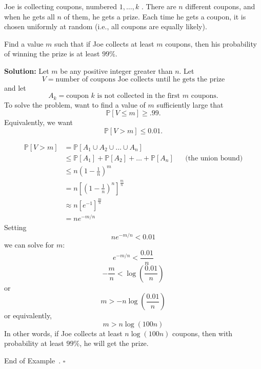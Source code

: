 \documentclass[10pt]{article}
\theoremstyle{definition}
\newtheorem{example}[theorem]{Example}
\renewenvironment{example}
{\begin{oldexample}}
  {\par\smallskip\hfill   End of Example~\theexample. $\square$    \par\end{oldexample}}
\newcommand{\fl}{\noindent\textbf} %
\newcommand{\1}[1]{\textbf{1}_{\left[#1\right]}} %
\def\P{\mathbb{P}} %
\begin{document}
\begin{example}
  Joe is collecting coupons, numbered $1,\ldots,k$ . There are $n$ different
  coupons, and when he gets all $n$ of them, he gets a prize. Each time he
  gets a coupon, it is chosen uniformly at random (i.e., all coupons are
  equally likely).

  Find a value $m$ such that if Joe collects at least $m$ coupons, then his
  probability of winning the prize is at least $99\%$.

  \fl{Solution:} Let $m$ be any positive integer greater than $n$. Let
  \begin{equation*}
    V = \text{number of coupons Joe collects until he gets the prize}
  \end{equation*}
  and let
  \begin{equation*}
    A_{k} = \text{coupon $k$ is not collected in the first $m$ coupons}.
  \end{equation*}
  To solve the problem, want to find a value of $m$ sufficiently large that
  \begin{equation*}
    \P\left[V \leq m\right] \geq .99.
  \end{equation*}
  Equivalently, we want
  \begin{equation*}
    \P\left[V>m \right] \leq 0.01.
  \end{equation*}%

  \begin{align*}
    \P\left[V>m \right] 
    &= \P\left[A_{1}\cup A_{2}\cup \ldots \cup A_{n} \right]\\
    &\leq \P\left[A_{1} \right]+ \P\left[A_{2} \right]+\ldots+\P\left[A_{n}
      \right] &&\text{(the union bound)}\\
    &\leq n \left( 1-\frac{1}{n} \right)^{m}\\ 
    &= n \left[ \left( 1-\frac{1}{n} \right)^{n}  \right]^{\frac{m}{n}}\\
    &\approx n \left[ e^{-1} \right]^{\frac{m}{n}}\\ 
    &= ne^{-m/n}
  \end{align*}
  Setting
  \begin{equation*}
    ne^{-m/n}<0.01
  \end{equation*}
  we can solve for $m$:
  \begin{equation*}
    e^{-m/n}< \frac{0.01}{n}
  \end{equation*}
  \begin{equation*}
    -\frac{m}{n} < \log \left( \frac{0.01}{n} \right) 
  \end{equation*}
  or
  \begin{equation*}
    m > - n\log\left(\frac{0.01}{n} \right) 
  \end{equation*}
  or equivalently,
  \begin{equation*}
    m > n \log\left(100n \right) 
  \end{equation*}
  In other words, if Joe collects at least $n \log\left(100n \right)$ coupons,
  then with probability at least $99\%$, he will get the prize.


\end{example}
\end{document}

